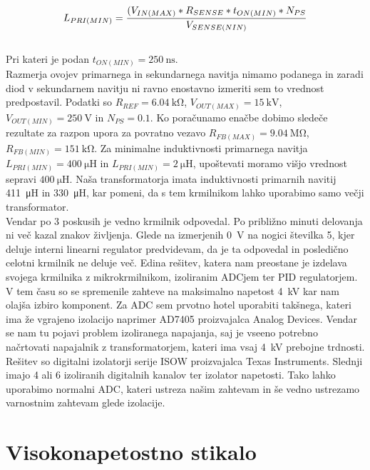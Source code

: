 \documentclass[a4paper,twoside,openright,12pt,slovene]{book}
\begin{document}
    \begin{equation}
        \\ L_{PRI(MIN)} = \frac{(V_{IN(MAX)} * R_{SENSE} * t_{ON(MIN)} * N_{PS}} {V_{SENSE(NIN)}}
    \end{equation}
    \\Pri kateri je podan \(t_{ON(MIN)}=\SI{250}{\nano\second}\). 
    ~\\Razmerja ovojev primarnega in sekundarnega navitja nimamo podanega in zaradi diod v sekundarnem navitju ni ravno enostavno izmeriti sem to vrednost predpostavil. Podatki so \(R_{REF}=\SI{6.04}{\kilo\ohm}\), \(V_{OUT(MAX)}=\SI{15}{\kilo\volt}\), \(V_{OUT(MIN)}=\SI{250}{\volt}\) in \(N_{PS}=0.1\).
    Ko poračunamo enačbe dobimo sledeče rezultate za razpon upora za povratno vezavo \(R_{FB(MAX)}=\SI{9.04}{\mega\ohm}\), \(R_{FB(MIN)}=\SI{151}{\kilo\ohm}\). Za minimalne induktivnosti primarnega navitja \(L_{PRI(MIN)}=\SI{400}{\micro\henry}\) in \(L_{PRI(MIN)}=\SI{2}{\micro\henry}\), upoštevati moramo višjo vrednost sepravi \(\SI{400}{\micro\henry}\).
    Naša transformatorja imata induktivnosti primarnih navitij \SI{411}{\micro\henry} in \SI{330}{\micro\henry}, kar pomeni, da s tem krmilnikom lahko uporabimo samo večji transformator. 
~\\Vendar po 3 poskusih je vedno krmilnik odpovedal. Po približno minuti delovanja ni več kazal znakov življenja. Glede na izmerjenih \SI{0}{\volt} na nogici številka 5, kjer deluje interni linearni regulator predvidevam, da je ta odpovedal in posledično celotni krmilnik ne deluje več. Edina rešitev, katera nam preostane je izdelava svojega krmilnika z mikrokrmilnikom, izoliranim ADCjem ter PID regulatorjem. V tem času so se spremenile zahteve na maksimalno napetost \SI{4}{\kilo\volt} kar nam olajša izbiro komponent. Za ADC sem prvotno hotel uporabiti takšnega, kateri ima že vgrajeno izolacijo naprimer AD7405 proizvajalca Analog Devices. Vendar se nam tu pojavi problem izoliranega napajanja, saj je vseeno potrebno načrtovati napajalnik z transformatorjem, kateri ima vsaj \SI{4}{\kilo\volt} prebojne trdnosti. Rešitev so digitalni izolatorji serije ISOW proizvajalca Texas Instruments. Slednji imajo 4 ali 6 izoliranih digitalnih kanalov ter izolator napetosti. Tako lahko uporabimo normalni ADC, kateri ustreza našim zahtevam in še vedno ustrezamo varnostnim zahtevam glede izolacije.
    
    \chapter{Visokonapetostno stikalo} \label{Visokonapetostno_stikalo}
\end{document}
